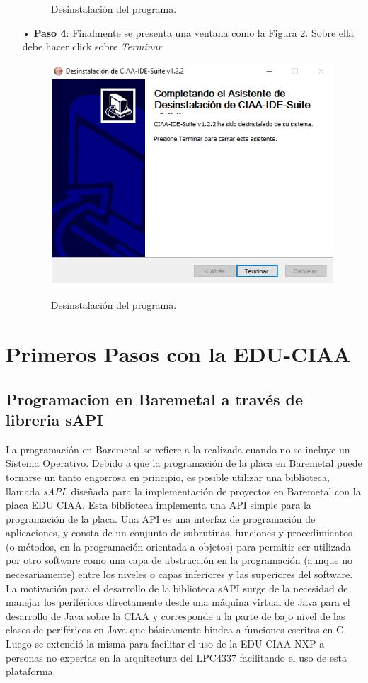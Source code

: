 \documentclass[12pt,letterpaper]{article}
\begin{document}
\begin{enumerate}
\begin{figure}[H]
\caption{Desinstalación del programa.}
\label{des2}
\end{figure}
\item[•]\textbf{Paso 4}: Finalmente se presenta una ventana como la Figura \ref{des3}. Sobre ella debe hacer click sobre \textit{Terminar}.
\begin{figure}[H]
\centering
\includegraphics[width=8 cm]{figuras/des3.png}\\
\caption{Desinstalación del programa.}
\label{des3}
\end{figure}
\end{enumerate}
\section{Primeros Pasos con la EDU-CIAA}

\subsection{Programacion en Baremetal a través de libreria sAPI}\label{sec:programacionbaremetal}
La programación en Baremetal se refiere a la realizada cuando no se incluye un Sistema Operativo. Debido a que la programación de la placa en Baremetal puede tornarse un tanto engorrosa en principio, es posible utilizar una biblioteca, llamada \textit{sAPI}, diseñada para la implementación de proyectos en Baremetal con la placa EDU CIAA. Esta biblioteca implementa una API simple para la programación de la placa. Una API es una interfaz de programación de aplicaciones, y consta de un conjunto de subrutinas, funciones y procedimientos (o métodos, en la programación orientada a objetos) para permitir ser utilizada por otro software como una capa de abstracción en la programación (aunque no necesariamente) entre los niveles o capas inferiores y las superiores del software.
 \\
 
La motivación para el desarrollo de la biblioteca sAPI surge de la necesidad de manejar los periféricos directamente desde una máquina virtual de Java para el desarrollo de Java sobre la CIAA y corresponde a la parte de bajo nivel de las clases de periféricos en Java que básicamente bindea a funciones escritas en C.
Luego se extendió la misma para facilitar el uso de la EDU-CIAA-NXP a personas no expertas en la arquitectura del LPC4337 facilitando el uso de esta plataforma.
 \\
 
\end{document}
